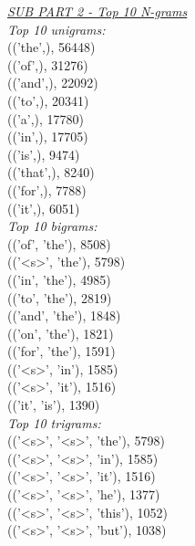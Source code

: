 \documentclass[11ppt]{article}
\begin{document}
\vspace{3mm}
\textit{\underline{SUB PART 2 - Top 10 N-grams}}\\
\vspace{3mm}
\textit{Top 10 unigrams:} \\ \vspace{1mm}
(('the',), 56448) \\
(('of',), 31276) \\
(('and',), 22092) \\
(('to',), 20341) \\
(('a',), 17780) \\
(('in',), 17705) \\
(('is',), 9474) \\
(('that',), 8240) \\
(('for',), 7788) \\
(('it',), 6051) \\
\vspace{2mm}
\textit{Top 10 bigrams:} \\ \vspace{1mm}
(('of', 'the'), 8508) \\
(('\textless s\textgreater', 'the'), 5798) \\
(('in', 'the'), 4985) \\
(('to', 'the'), 2819) \\
(('and', 'the'), 1848) \\
(('on', 'the'), 1821) \\
(('for', 'the'), 1591) \\
(('\textless s\textgreater', 'in'), 1585) \\
(('\textless s\textgreater', 'it'), 1516) \\
(('it', 'is'), 1390) \\
\vspace{2mm}
\textit{Top 10 trigrams:} \\ \vspace{1mm}
(('\textless s\textgreater', '\textless s\textgreater', 'the'), 5798) \\
(('\textless s\textgreater', '\textless s\textgreater', 'in'), 1585) \\
(('\textless s\textgreater', '\textless s\textgreater', 'it'), 1516) \\
(('\textless s\textgreater', '\textless s\textgreater', 'he'), 1377) \\
(('\textless s\textgreater', '\textless s\textgreater', 'this'), 1052) \\
(('\textless s\textgreater', '\textless s\textgreater', 'but'), 1038) \\
\end{document}
